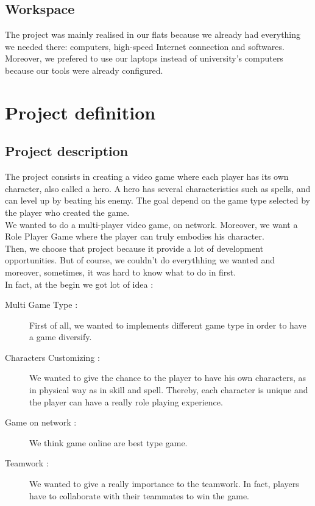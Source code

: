 \documentclass{scrreprt}
\begin{document}
		  \section{Workspace}
		  The project was mainly realised in our flats because we already had everything we needed there:
		  computers, high-speed Internet connection and softwares. Moreover, we prefered to use our laptops
		  instead of university's computers because our tools were already configured.

		  \chapter{Project definition}
		  \section{Project description} %
		  The project consists in creating a video game where each player has its own character, also 
		  called a hero. A hero has several characteristics such as %
		  spells, and can level up by beating his enemy. The goal depend on the game type selected by the player who created the game.\\

		  We wanted to do a multi-player video game, on network. Moreover, we want a Role Player Game where the player can truly embodies his character.\\

		  Then, we choose that project because it provide a lot of development opportunities. But of course, we couldn't do everythhing we wanted and moreover, sometimes, it was hard to know what to do in first.\\

		  In fact, at the begin we got lot of idea :
		  \begin{description}
		  \item[Multi Game Type :]{ First of all, we wanted to implements different game type in order to have a game diversify.}
		  \item[Characters Customizing :] {We wanted to give the chance to the player to have his own characters, as in physical way as in skill and spell. Thereby, each character is unique and the player can have a really role playing experience.}
		  \item[Game on network :] {We think game online are best type game.}
		  \item[Teamwork :] {We wanted to give a really importance to the teamwork. In fact, players have to collaborate with their teammates to win the game.}
		  \end{description}
\end{document}
